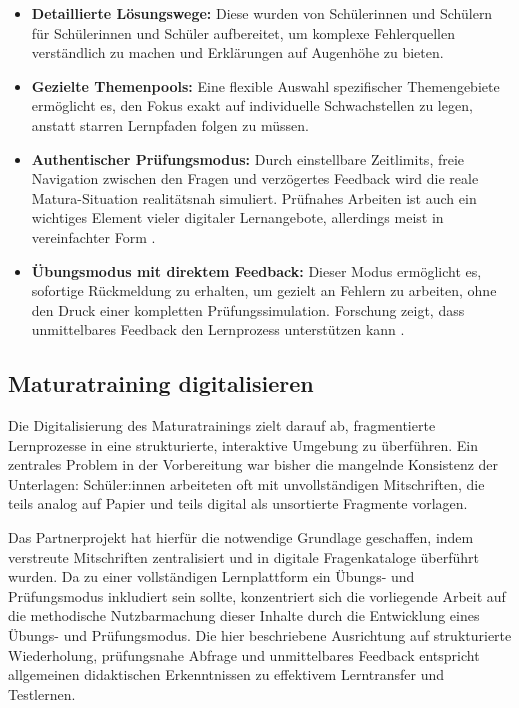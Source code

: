 \begin{itemize}
    \item \textbf{Detaillierte Lösungswege:} Diese wurden von Schülerinnen und Schülern für Schülerinnen und Schüler aufbereitet, um komplexe Fehlerquellen verständlich zu machen und Erklärungen auf Augenhöhe zu bieten.
    \item \textbf{Gezielte Themenpools:} Eine flexible Auswahl spezifischer Themengebiete ermöglicht es, den Fokus exakt auf individuelle Schwachstellen zu legen, anstatt starren Lernpfaden folgen zu müssen.
    \item \textbf{Authentischer Prüfungsmodus:} Durch einstellbare Zeitlimits, freie Navigation zwischen den Fragen und verzögertes Feedback wird die reale Matura-Situation realitätsnah simuliert. Prüfnahes Arbeiten ist auch ein wichtiges Element vieler digitaler Lernangebote, allerdings meist in vereinfachter Form \cite{StudySmarterFeatures} \cite{SerloAbout}.
    \item \textbf{Übungsmodus mit direktem Feedback:} Dieser Modus ermöglicht es, sofortige Rückmeldung zu erhalten, um gezielt an Fehlern zu arbeiten, ohne den Druck einer kompletten Prüfungssimulation. Forschung zeigt, dass unmittelbares Feedback den Lernprozess unterstützen kann \cite{FeedbackTimeMultimediaLearning}.
\end{itemize}

\subsection{Maturatraining digitalisieren}
\setauthor{\secondauthor}

Die Digitalisierung des Maturatrainings zielt darauf ab, fragmentierte Lernprozesse in eine strukturierte, interaktive Umgebung zu überführen. Ein zentrales Problem in der Vorbereitung war bisher die mangelnde Konsistenz der Unterlagen: Schüler:innen arbeiteten oft mit unvollständigen Mitschriften, die teils analog auf Papier und teils digital als unsortierte Fragmente vorlagen.

Das Partnerprojekt hat hierfür die notwendige Grundlage geschaffen, indem verstreute Mitschriften zentralisiert und in digitale Fragenkataloge überführt wurden. Da zu einer vollständigen Lernplattform ein Übungs- und Prüfungsmodus inkludiert sein sollte, konzentriert sich die vorliegende Arbeit auf die methodische Nutzbarmachung dieser Inhalte durch die Entwicklung eines Übungs- und Prüfungsmodus. Die hier beschriebene Ausrichtung auf strukturierte Wiederholung, prüfungsnahe Abfrage und unmittelbares Feedback entspricht allgemeinen didaktischen Erkenntnissen zu effektivem Lerntransfer und Testlernen.